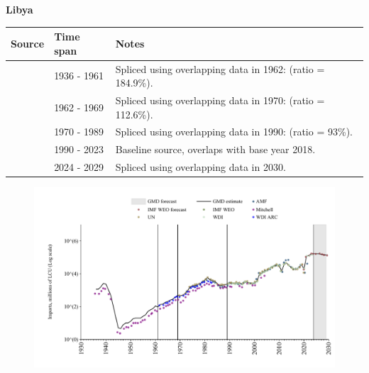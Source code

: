 \documentclass[12pt,a4paper,landscape]{article}
\begin{document}
\begin{adjustbox}{max totalsize={\paperwidth}{\paperheight},center}
\begin{minipage}[t][\textheight][t]{\textwidth}
\vspace*{0.5cm}
{}
\begin{center}
{\Large\bfseries Libya}
\end{center}
\vspace{0.5cm}
\begin{table}[H]
\centering
\small
\begin{tabular}{|l|l|l|}
\hline
\textbf{Source} & \textbf{Time span} & \textbf{Notes} \\
\hline
\rowcolor{white}\cite{Mitchell}& 1936 - 1961 &Spliced using overlapping data in 1962: (ratio = 184.9\%).\\
\rowcolor{lightgray}\cite{WDI_ARC}& 1962 - 1969 &Spliced using overlapping data in 1970: (ratio = 112.6\%).\\
\rowcolor{white}\cite{UN}& 1970 - 1989 &Spliced using overlapping data in 1990: (ratio = 93\%).\\
\rowcolor{lightgray}\cite{WDI}& 1990 - 2023 &Baseline source, overlaps with base year 2018.\\
\rowcolor{white}\cite{IMF_WEO_forecast}& 2024 - 2029 &Spliced using overlapping data in 2030.\\
\hline
\end{tabular}
\end{table}
\begin{figure}[H]
\centering
\includegraphics[width=\textwidth,height=0.6\textheight,keepaspectratio]{graphs/LBY_imports.pdf}
\end{figure}
\end{minipage}
\end{adjustbox}
\end{document}
